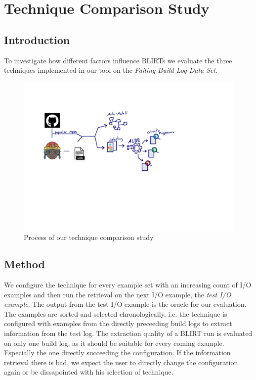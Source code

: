 \documentclass[\myrootdir/main.tex]{subfiles}
\begin{document}
\chapter{Technique Comparison Study}
\label{sec:study}
\section{Introduction}
To investigate how different factors  influence BLIRTs we evaluate the three techniques implemented in our tool on the \emph{Failing Build Log Data Set}.

\begin{figure}[h]
	\centering
	\includegraphics[page=6, width=\textwidth, trim={0.5cm 0.5cm 0.5cm 0.5cm}, clip]{img/flow-of-research.pdf}
	\caption{Process of our technique comparison study}
	\label{fig:study}
\end{figure}

\section{Method}
We configure the technique for every example set with an increasing count of I/O examples and then run the retrieval on the next I/O example, the \emph{test I/O example}.
The output from the test I/O example is the oracle for our evaluation.
The examples are sorted and selected chronologically, i.e. the technique is configured with examples from the directly preceeding build logs to extract information from the test log.
The extraction quality of a BLIRT run is evaluated on only one build log, as it should be suitable for every coming example.
Especially the one directly succeeding the configuration.
If the information retrieval there is bad, we expect the user to directly change the configuration again or be dissapointed with his selection of technique.
\end{document}
